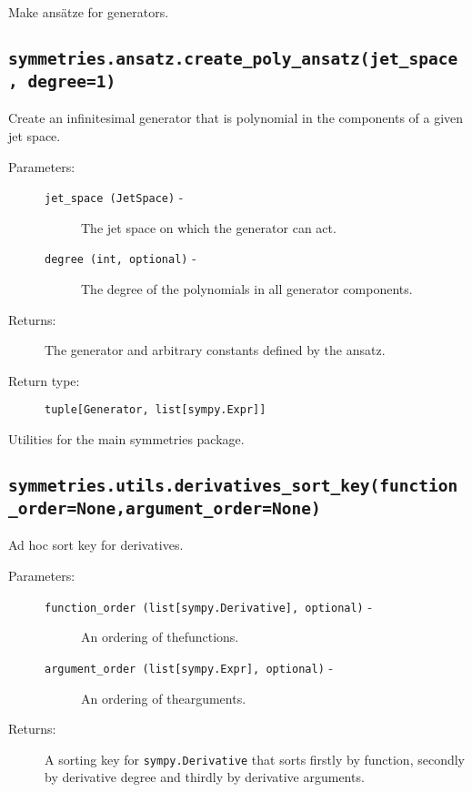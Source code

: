 
Make ansätze for generators.

\subsection*{\lstinline{symmetries.ansatz.create_poly_ansatz(jet_space, degree=1)}}

   Create an infinitesimal generator that is polynomial in the
   components of a given jet space.

   \begin{description}
      \item[Parameters:] \leavevmode
        \begin{description}
            \item[\lstinline{jet_space (JetSpace)} -] The jet space on which the generator can act.
            \item[\lstinline{degree (int, optional)} -] The degree of the polynomials in all generator components.
        \end{description}
      \item[Returns:] The generator and arbitrary constants defined by the ansatz.
      \item[Return type:] \lstinline{tuple[Generator, list[sympy.Expr]]}
   \end{description}


Utilities for the main symmetries package.

\subsection*{\lstinline{symmetries.utils.derivatives_sort_key(function_order=None,}\newline\lstinline{argument_order=None)}}

   Ad hoc sort key for derivatives.

   \begin{description}
      \item[Parameters:] \leavevmode
        \begin{description}
            \item[\lstinline{function_order (list[sympy.Derivative], optional)} -] An ordering of the\newline functions.
            \item[\lstinline{argument_order (list[sympy.Expr], optional)} -] An ordering of the\newline arguments.
        \end{description}
      \item[Returns:] A sorting key for \lstinline{sympy.Derivative} that sorts firstly by function, secondly by derivative degree and thirdly by derivative arguments.
   \end{description}

